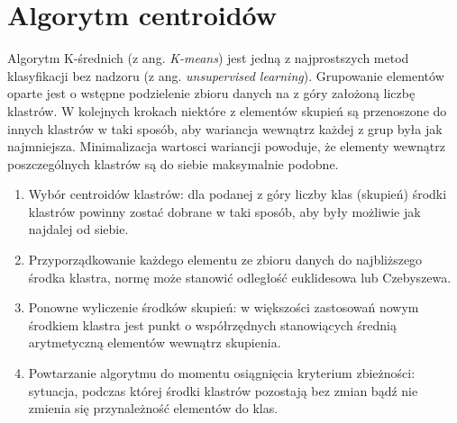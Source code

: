 \section{Algorytm centroidów}
Algorytm K-średnich (z ang. \textit{K-means}) jest jedną z najprostszych metod klasyfikacji bez nadzoru (z ang. \textit{unsupervised learning}). Grupowanie elementów oparte jest o wstępne podzielenie zbioru danych na z góry założoną liczbę klastrów. W kolejnych krokach niektóre z elementów skupień są przenoszone do innych klastrów w taki sposób, aby wariancja wewnątrz każdej z grup była jak najmniejsza. Minimalizacja wartosci wariancji powoduje, że elementy wewnątrz poszczególnych klastrów są do siebie maksymalnie podobne. 

\begin{enumerate}
	\item Wybór centroidów klastrów: dla podanej z góry liczby klas (skupień)  środki klastrów powinny zostać dobrane w taki sposób, aby były możliwie jak najdalej od siebie.
	\item Przyporządkowanie każdego elementu ze zbioru danych do najbliższego środka klastra, normę może stanowić odległość euklidesowa lub Czebyszewa.
	\item Ponowne wyliczenie środków skupień: w większości zastosowań nowym środkiem klastra jest punkt o współrzędnych stanowiących średnią arytmetyczną elementów wewnątrz skupienia.
	\item Powtarzanie algorytmu do momentu osiągnięcia kryterium zbieżności: sytuacja, podczas której środki klastrów pozostają bez zmian bądź nie zmienia się przynależność elementów do klas.
\end{enumerate}
